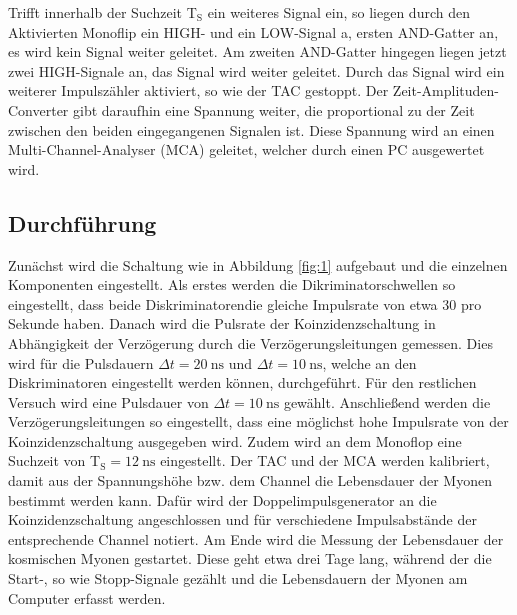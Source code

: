 Trifft innerhalb der Suchzeit T$_{\text{S}}$ ein weiteres Signal ein, so liegen durch den Aktivierten Monoflip ein HIGH- und ein LOW-Signal a, ersten AND-Gatter an, es wird kein Signal weiter geleitet.
Am zweiten AND-Gatter hingegen liegen jetzt zwei HIGH-Signale an, das Signal wird weiter geleitet.
Durch das Signal wird ein weiterer Impulszähler aktiviert, so wie der TAC gestoppt.
Der Zeit-Amplituden-Converter gibt daraufhin eine Spannung weiter, die proportional zu der Zeit zwischen den beiden eingegangenen Signalen ist.
Diese Spannung wird an einen Multi-Channel-Analyser (MCA) geleitet, welcher durch einen PC ausgewertet wird.

\subsection{Durchführung}
Zunächst wird die Schaltung wie in Abbildung \ref{fig:1} aufgebaut und die einzelnen Komponenten eingestellt.
Als erstes werden die Dikriminatorschwellen so eingestellt, dass beide Diskriminatorendie gleiche Impulsrate von etwa 30 pro Sekunde haben.
Danach wird die Pulsrate der Koinzidenzschaltung in Abhängigkeit der Verzögerung durch die Verzögerungsleitungen gemessen.
Dies wird für die Pulsdauern $\Delta t = \SI{20}{\nano\second}$ und $\Delta t = \SI{10}{\nano\second}$, welche an den Diskriminatoren eingestellt werden können, durchgeführt.
Für den restlichen Versuch wird eine Pulsdauer von $\Delta t = \SI{10}{\nano\second}$ gewählt.
Anschließend werden die Verzögerungsleitungen so eingestellt, dass eine möglichst hohe Impulsrate von der Koinzidenzschaltung ausgegeben wird.
Zudem wird an dem Monoflop eine Suchzeit von T$_{\text{S}} = \SI{12}{\nano\second}$ eingestellt.
Der TAC und der MCA werden kalibriert, damit aus der Spannungshöhe bzw. dem Channel die Lebensdauer der Myonen bestimmt werden kann.
Dafür wird der Doppelimpulsgenerator an die Koinzidenzschaltung angeschlossen und für verschiedene Impulsabstände der entsprechende Channel notiert.
Am Ende wird die Messung der Lebensdauer der kosmischen Myonen gestartet.
Diese geht etwa drei Tage lang, während der die Start-, so wie Stopp-Signale gezählt und die Lebensdauern der Myonen am Computer erfasst werden.